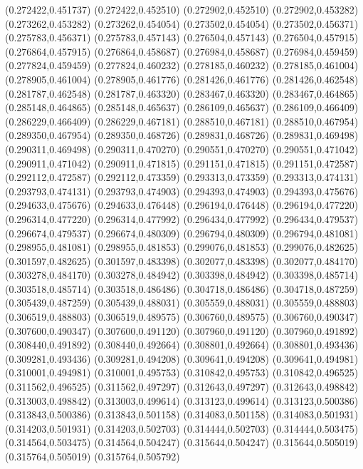 (0.272422,0.451737)
(0.272422,0.452510)
(0.272902,0.452510)
(0.272902,0.453282)
(0.273262,0.453282)
(0.273262,0.454054)
(0.273502,0.454054)
(0.273502,0.456371)
(0.275783,0.456371)
(0.275783,0.457143)
(0.276504,0.457143)
(0.276504,0.457915)
(0.276864,0.457915)
(0.276864,0.458687)
(0.276984,0.458687)
(0.276984,0.459459)
(0.277824,0.459459)
(0.277824,0.460232)
(0.278185,0.460232)
(0.278185,0.461004)
(0.278905,0.461004)
(0.278905,0.461776)
(0.281426,0.461776)
(0.281426,0.462548)
(0.281787,0.462548)
(0.281787,0.463320)
(0.283467,0.463320)
(0.283467,0.464865)
(0.285148,0.464865)
(0.285148,0.465637)
(0.286109,0.465637)
(0.286109,0.466409)
(0.286229,0.466409)
(0.286229,0.467181)
(0.288510,0.467181)
(0.288510,0.467954)
(0.289350,0.467954)
(0.289350,0.468726)
(0.289831,0.468726)
(0.289831,0.469498)
(0.290311,0.469498)
(0.290311,0.470270)
(0.290551,0.470270)
(0.290551,0.471042)
(0.290911,0.471042)
(0.290911,0.471815)
(0.291151,0.471815)
(0.291151,0.472587)
(0.292112,0.472587)
(0.292112,0.473359)
(0.293313,0.473359)
(0.293313,0.474131)
(0.293793,0.474131)
(0.293793,0.474903)
(0.294393,0.474903)
(0.294393,0.475676)
(0.294633,0.475676)
(0.294633,0.476448)
(0.296194,0.476448)
(0.296194,0.477220)
(0.296314,0.477220)
(0.296314,0.477992)
(0.296434,0.477992)
(0.296434,0.479537)
(0.296674,0.479537)
(0.296674,0.480309)
(0.296794,0.480309)
(0.296794,0.481081)
(0.298955,0.481081)
(0.298955,0.481853)
(0.299076,0.481853)
(0.299076,0.482625)
(0.301597,0.482625)
(0.301597,0.483398)
(0.302077,0.483398)
(0.302077,0.484170)
(0.303278,0.484170)
(0.303278,0.484942)
(0.303398,0.484942)
(0.303398,0.485714)
(0.303518,0.485714)
(0.303518,0.486486)
(0.304718,0.486486)
(0.304718,0.487259)
(0.305439,0.487259)
(0.305439,0.488031)
(0.305559,0.488031)
(0.305559,0.488803)
(0.306519,0.488803)
(0.306519,0.489575)
(0.306760,0.489575)
(0.306760,0.490347)
(0.307600,0.490347)
(0.307600,0.491120)
(0.307960,0.491120)
(0.307960,0.491892)
(0.308440,0.491892)
(0.308440,0.492664)
(0.308801,0.492664)
(0.308801,0.493436)
(0.309281,0.493436)
(0.309281,0.494208)
(0.309641,0.494208)
(0.309641,0.494981)
(0.310001,0.494981)
(0.310001,0.495753)
(0.310842,0.495753)
(0.310842,0.496525)
(0.311562,0.496525)
(0.311562,0.497297)
(0.312643,0.497297)
(0.312643,0.498842)
(0.313003,0.498842)
(0.313003,0.499614)
(0.313123,0.499614)
(0.313123,0.500386)
(0.313843,0.500386)
(0.313843,0.501158)
(0.314083,0.501158)
(0.314083,0.501931)
(0.314203,0.501931)
(0.314203,0.502703)
(0.314444,0.502703)
(0.314444,0.503475)
(0.314564,0.503475)
(0.314564,0.504247)
(0.315644,0.504247)
(0.315644,0.505019)
(0.315764,0.505019)
(0.315764,0.505792)
